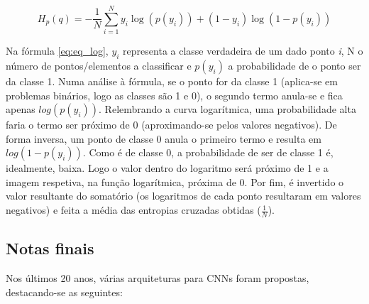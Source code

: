 \begin{equation}
 H_{p}(q) = -\frac{1}{N}\sum_{i=1}^{N}y_{i}\log(p(y_{i}))+(1-y_{i})\log(1-p(y_{i}))
 \label{eq:eq_log}
\end{equation}

\noindent Na fórmula \ref{eq:eq_log}, \emph{$y_{i}$} representa a classe verdadeira de um dado ponto \emph{i}, N o número de pontos/elementos a classificar e \emph{$p(y_{i})$} a probabilidade de o ponto ser da classe 1. Numa análise à fórmula, se o ponto for da classe 1 (aplica-se em problemas binários, logo as classes são 1 e 0), o segundo termo anula-se e fica apenas \emph{$log(p(y_{i}))$}. Relembrando a curva logarítmica, uma probabilidade alta faria o termo ser próximo de 0 (aproximando-se pelos valores negativos). \newline 
\noindent De forma inversa, um ponto de classe 0 anula o primeiro termo e resulta em \emph{$log(1-p(y_{i}))$}. Como é de classe 0, a probabilidade de ser de classe 1 é, idealmente, baixa. Logo o valor dentro do logaritmo será próximo de 1 e a imagem respetiva, na função logarítmica, próxima de 0.\newline
\noindent Por fim, é invertido o valor resultante do somatório (os logaritmos de cada ponto resultaram em valores negativos) e feita a média das entropias cruzadas obtidas (\emph{$\frac{1}{N}$}).

\subsection{Notas finais}
\label{chap2:subsec:notas}
Nos últimos 20 anos, várias arquiteturas para \ac{CNN}s foram propostas, destacando-se as seguintes:

